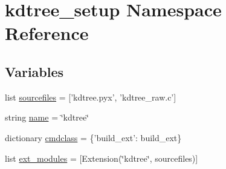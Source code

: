 \hypertarget{namespacekdtree__setup}{
\section{kdtree\_\-setup Namespace Reference}
\label{namespacekdtree__setup}
}
\subsection*{Variables}
\begin{DoxyCompactItemize}
\item 
list \hyperlink{namespacekdtree__setup_a0dc55a4d893db5d7ca3db49b1ca91b76}{sourcefiles} = \mbox{[}'kdtree.pyx', 'kdtree\_\-raw.c'\mbox{]}
\item 
string \hyperlink{namespacekdtree__setup_a7c264e573a15d7ce7bf7e39ad2d687f2}{name} = \char`\"{}kdtree\char`\"{}
\item 
dictionary \hyperlink{namespacekdtree__setup_aefcaebbabeda5e6a4ecf2a73db70c99a}{cmdclass} = \{'build\_\-ext': build\_\-ext\}
\item 
list \hyperlink{namespacekdtree__setup_a130a6b8035c5138496950a54d6c5fdd3}{ext\_\-modules} = \mbox{[}Extension(\char`\"{}kdtree\char`\"{}, sourcefiles)\mbox{]}
\end{DoxyCompactItemize}


